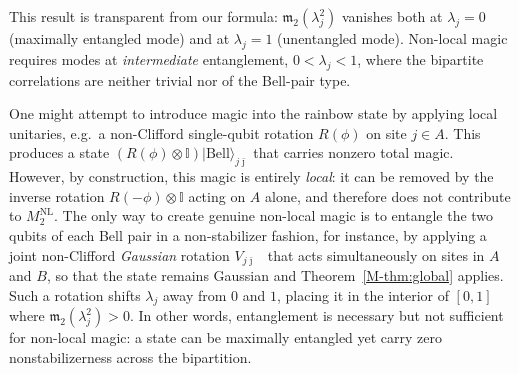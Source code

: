 \documentclass[aps,prl,twocolumn,superscriptaddress,reprint,longbibliography,nofootinbib]{revtex4-2}
\begin{document}
This result is transparent from our formula: $\mathfrak{m}_2(\lambda_j^2)$ vanishes both at $\lambda_j = 0$  (maximally entangled mode) and at $\lambda_j = 1$  (unentangled mode). Non-local magic requires modes at \emph{intermediate} entanglement, $0 < \lambda_j < 1$, where the bipartite correlations are neither trivial nor of the Bell-pair type.

One might attempt to introduce magic into the rainbow state by applying local unitaries, e.g.\ a non-Clifford single-qubit rotation $R(\phi)$ on site $j\in A$. This produces a state $(R(\phi)\otimes \mathbb{I})|\mathrm{Bell}\rangle_{j\bar\jmath}$ that carries nonzero total magic. However, by construction, this magic is entirely \emph{local}: it can be removed by the inverse rotation $R(-\phi)\otimes \mathbb{I}$ acting on $A$ alone, and therefore does not contribute to $M_2^{\mathrm{NL}}$. The only way to create genuine non-local magic is to entangle the two qubits of each Bell pair in a non-stabilizer fashion, for instance, by applying a joint non-Clifford \emph{Gaussian} rotation $V_{j\bar\jmath}$~\cite{huang2026dismagickerunitarygatenonstabilizerness} that acts simultaneously on sites in $A$ and $B$, so that the state remains Gaussian and Theorem~\ref{M-thm:global} applies. Such a rotation shifts $\lambda_j$ away from $0$ and $1$, placing it in the interior of $[0,1]$ where $\mathfrak{m}_2(\lambda_j^2) > 0$. In other words, entanglement is necessary but not sufficient for non-local magic: a state can be maximally entangled yet carry zero nonstabilizerness across the bipartition.
\end{document}
